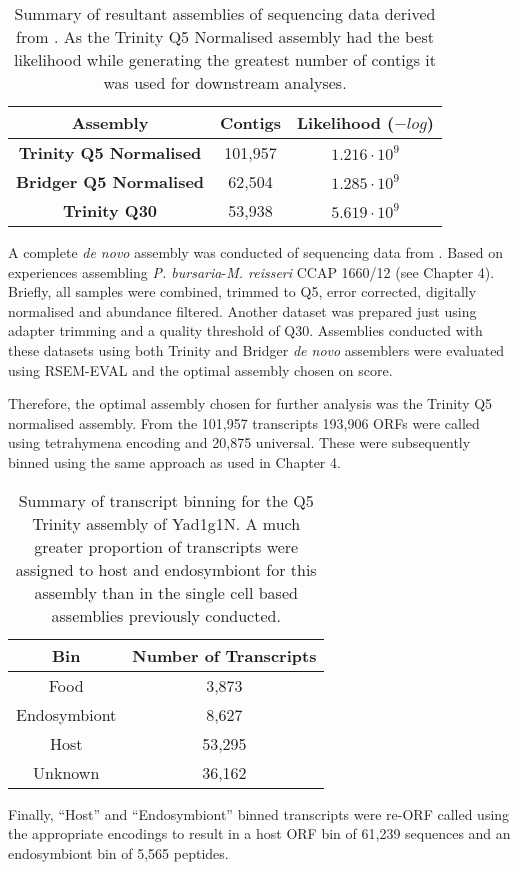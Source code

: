 \begin{table}
    \centering
    \begin{tabular}{|c|c|c|}
        \hline
        \textbf{Assembly} & \textbf{Contigs} & \textbf{Likelihood (\(-log\))}\\
        \hline
        \textbf{Trinity Q5 Normalised}  & 101,957 & \(1.216\cdot10^9\)\\
        \textbf{Bridger Q5 Normalised} & 62,504 & \(1.285\cdot10^9\)\\
        \textbf{Trinity Q30} & 53,938  & \(5.619\cdot10^{9} \) \\
        \hline
    \end{tabular}
    \caption[Summary of Yad1g1N Transcriptome Assemblies]{Summary of resultant 
    assemblies of sequencing data derived from \citep{Kodama2014c}.  As the
Trinity Q5 Normalised assembly had the best likelihood while generating
the greatest number of contigs it was used for downstream analyses.}
    \label{tab:kodama_assembly}
\end{table}

A complete \textit{de novo} assembly was conducted of sequencing data
from \citep{Kodama2014c}.  Based on experiences assembling
\textit{P. bursaria}-\textit{M. reisseri} CCAP 1660/12 (see Chapter 4).
Briefly, all samples were combined, trimmed to Q5, 
error corrected, digitally normalised and abundance filtered.  Another dataset
was prepared just using adapter trimming and a quality threshold of Q30.
Assemblies conducted with these datasets using both Trinity and Bridger
\textit{de novo} assemblers were evaluated using RSEM-EVAL and the optimal
assembly chosen on score. 

Therefore, the optimal assembly chosen for further analysis was the Trinity
Q5 normalised assembly.
From the 101,957 transcripts 193,906 ORFs were called using tetrahymena 
encoding and 20,875 universal.
These were subsequently binned using the same approach as used in 
Chapter 4.

\begin{table}
    \centering
    \begin{tabular}{|c|c|}
        \hline
        \textbf{Bin} & \textbf{Number of Transcripts} \\
        \hline
        Food & 3,873 \\
        Endosymbiont & 8,627 \\
        Host & 53,295 \\
        Unknown & 36,162 \\
        \hline
    \end{tabular}
    \caption[Yad1g1N Transcript Binning Summary]{Summary of transcript
        binning for the Q5 Trinity assembly of Yad1g1N.  
        A much greater proportion of transcripts were assigned
        to host and endosymbiont for this assembly than in the single cell
    based assemblies previously conducted.}
\end{table}
Finally, ``Host'' and ``Endosymbiont'' binned transcripts 
were re-ORF called using the appropriate encodings to result in a 
host ORF bin of 61,239 sequences
and an endosymbiont bin of 5,565 peptides. 

